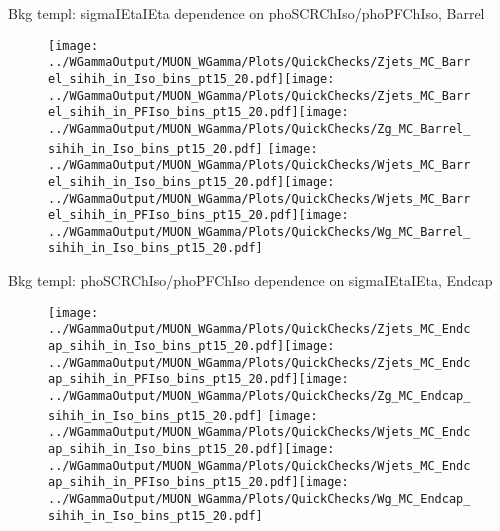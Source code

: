 \documentclass{beamer}
\begin{document}
\begin{frame}{Bkg templ: sigmaIEtaIEta dependence on phoSCRChIso/phoPFChIso, Barrel}
  \begin{figure}
    \centering
    \texttt{[image: ../WGammaOutput/MUON\_WGamma/Plots/QuickChecks/Zjets\_MC\_Barrel\_sihih\_in\_Iso\_bins\_pt15\_20.pdf]}\texttt{[image: ../WGammaOutput/MUON\_WGamma/Plots/QuickChecks/Zjets\_MC\_Barrel\_sihih\_in\_PFIso\_bins\_pt15\_20.pdf]}\texttt{[image: ../WGammaOutput/MUON\_WGamma/Plots/QuickChecks/Zg\_MC\_Barrel\_sihih\_in\_Iso\_bins\_pt15\_20.pdf]}
    \texttt{[image: ../WGammaOutput/MUON\_WGamma/Plots/QuickChecks/Wjets\_MC\_Barrel\_sihih\_in\_Iso\_bins\_pt15\_20.pdf]}\texttt{[image: ../WGammaOutput/MUON\_WGamma/Plots/QuickChecks/Wjets\_MC\_Barrel\_sihih\_in\_PFIso\_bins\_pt15\_20.pdf]}\texttt{[image: ../WGammaOutput/MUON\_WGamma/Plots/QuickChecks/Wg\_MC\_Barrel\_sihih\_in\_Iso\_bins\_pt15\_20.pdf]}
  \end{figure}
\end{frame}

\begin{frame}{Bkg templ: phoSCRChIso/phoPFChIso dependence on sigmaIEtaIEta, Endcap}
  \begin{figure}
    \centering
    \texttt{[image: ../WGammaOutput/MUON\_WGamma/Plots/QuickChecks/Zjets\_MC\_Endcap\_sihih\_in\_Iso\_bins\_pt15\_20.pdf]}\texttt{[image: ../WGammaOutput/MUON\_WGamma/Plots/QuickChecks/Zjets\_MC\_Endcap\_sihih\_in\_PFIso\_bins\_pt15\_20.pdf]}\texttt{[image: ../WGammaOutput/MUON\_WGamma/Plots/QuickChecks/Zg\_MC\_Endcap\_sihih\_in\_Iso\_bins\_pt15\_20.pdf]}
    \texttt{[image: ../WGammaOutput/MUON\_WGamma/Plots/QuickChecks/Wjets\_MC\_Endcap\_sihih\_in\_Iso\_bins\_pt15\_20.pdf]}\texttt{[image: ../WGammaOutput/MUON\_WGamma/Plots/QuickChecks/Wjets\_MC\_Endcap\_sihih\_in\_PFIso\_bins\_pt15\_20.pdf]}\texttt{[image: ../WGammaOutput/MUON\_WGamma/Plots/QuickChecks/Wg\_MC\_Endcap\_sihih\_in\_Iso\_bins\_pt15\_20.pdf]}
  \end{figure}
\end{frame}



\end{document}

